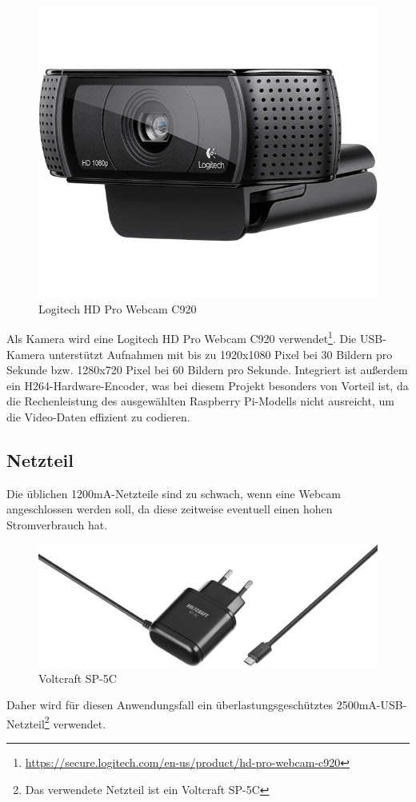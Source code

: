 \begin{figure}[ht]
    \centering
    \includegraphics[scale=0.2]{images/c920webcam}
    \caption{\cite{img02} Logitech HD Pro Webcam C920}
    \label{fig:webcam}
\end{figure}
Als Kamera wird eine Logitech HD Pro Webcam C920 verwendet\footnote{\href{https://secure.logitech.com/en-us/product/hd-pro-webcam-c920}{https://secure.logitech.com/en-us/product/hd-pro-webcam-c920}}.
Die USB-Kamera unterst\"utzt Aufnahmen mit bis zu 1920x1080 Pixel bei 30 Bildern pro Sekunde bzw. 1280x720 Pixel bei 60 Bildern pro Sekunde. Integriert ist au{\ss}erdem ein H264-Hardware-Encoder, was bei diesem Projekt besonders von Vorteil ist, da die Rechenleistung des ausgew\"ahlten Raspberry Pi-Modells nicht ausreicht, um die Video-Daten effizient zu codieren.\\


\subsection{Netzteil}
Die \"ublichen 1200mA-Netzteile sind zu schwach, wenn eine Webcam angeschlossen werden soll, da diese zeitweise eventuell einen hohen Stromverbrauch hat.
\begin{figure}[h]
    \centering
    \includegraphics[scale=0.2]{images/netzteil}
    \caption{\cite{img03} Voltcraft SP-5C}
    \label{fig:netzteil}
\end{figure}
Daher wird f\"ur diesen Anwendungsfall ein \"uberlastungsgesch\"utztes 2500mA-USB-Netzteil\footnote{Das verwendete Netzteil ist ein Voltcraft SP-5C} verwendet.\\


